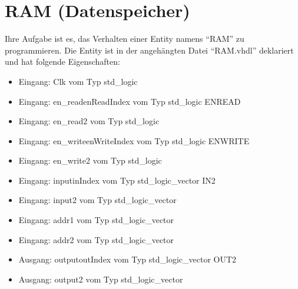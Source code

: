 \documentclass[a4paper,12pt]{article}
\begin{document}
\pagestyle{empty}
\setlength{\parindent}{0em}
\section*{RAM (Datenspeicher)}

Ihre Aufgabe ist es, das Verhalten einer Entity  namens "`RAM"' zu programmieren. Die Entity ist in der angeh\"angten Datei "`RAM.vhdl"' deklariert und hat folgende Eigenschaften:

\begin{itemize}
\item Eingang:  Clk vom Typ std\_logic
\item Eingang:  en\_read{{enReadIndex}} vom Typ std\_logic
{{ENREAD}}\item Eingang:  en\_read2 vom Typ std\_logic
\item Eingang:  en\_write{{enWriteIndex}} vom Typ std\_logic
{{ENWRITE}}\item Eingang:  en\_write2 vom Typ std\_logic
\item Eingang:  input{{inIndex}} vom Typ std\_logic\_vector
{{IN2}}\item Eingang:  input2 vom Typ std\_logic\_vector
\item Eingang:  addr1 vom Typ std\_logic\_vector
\item Eingang:  addr2 vom Typ std\_logic\_vector
\item Ausgang: output{{outIndex}} vom Typ std\_logic\_vector
{{OUT2}}\item Ausgang: output2 vom Typ std\_logic\_vector
\end{itemize}
\end{document}
